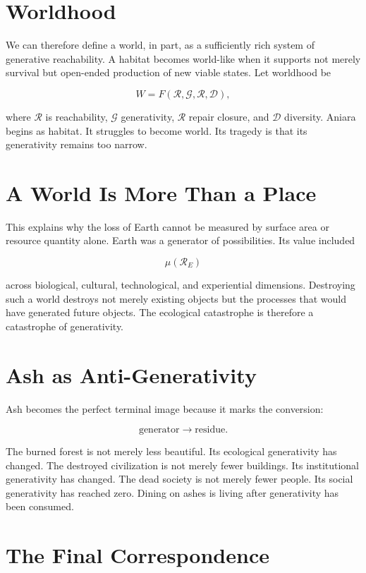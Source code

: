 \documentclass[11pt,oneside]{book}
\theoremstyle{definition}
\theoremstyle{remark}
\newcommand{\R}{\mathcal{R}}
\begin{document}
\section{Worldhood}

We can therefore define a world, in part, as a sufficiently rich system of generative reachability.
A habitat becomes world-like when it supports not merely survival but open-ended production of new
viable states. Let worldhood be

\[
W = F(\R,\mathcal G,\mathcal R,\mathcal D),
\]

where \(\R\) is reachability, \(\mathcal G\) generativity, \(\mathcal R\) repair closure, and
\(\mathcal D\) diversity. Aniara begins as habitat. It struggles to become world. Its tragedy is
that its generativity remains too narrow.

\section{A World Is More Than a Place}

This explains why the loss of Earth cannot be measured by surface area or resource quantity alone.
Earth was a generator of possibilities. Its value included

\[
\mu(\R_E)
\]

across biological, cultural, technological, and experiential dimensions. Destroying such a world
destroys not merely existing objects but the processes that would have generated future objects. The
ecological catastrophe is therefore a catastrophe of generativity.

\section{Ash as Anti-Generativity}

Ash becomes the perfect terminal image because it marks the conversion:

\[
\text{generator} \rightarrow \text{residue}.
\]

The burned forest is not merely less beautiful. Its ecological generativity has changed. The
destroyed civilization is not merely fewer buildings. Its institutional generativity has changed.
The dead society is not merely fewer people. Its social generativity has reached zero. Dining on
ashes is living after generativity has been consumed.

\section{The Final Correspondence}
\end{document}
